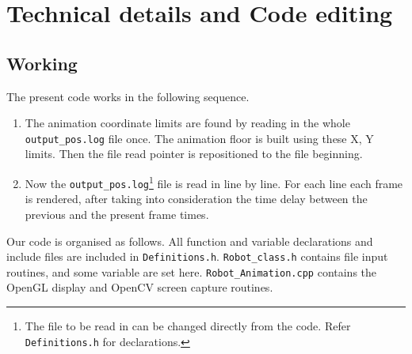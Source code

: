 \documentclass[10pt,a4paper]{article}
\begin{document}
\section{Technical details and Code editing}
\subsection{Working}
The present code works in the following sequence.
\begin{enumerate}
\item The anima\-tion co\-ordinate limits are found by reading in the whole \\ \texttt{output\_pos.log} file once. The animation floor is built using these X, Y limits. Then the file read pointer is repositioned to the file beginning.
\item Now the \texttt{output\_pos.log}\footnote{The file to be read in can be changed directly from the code. Refer \texttt{Definitions.h} for declarations.} file is read in line by line. For each line each frame is rendered, after taking into consideration the time delay between the previous and the present frame times.
\end{enumerate}
%
%
Our code is organised as follows. All function and variable declarations and include files are included in \texttt{Definitions.h}. \texttt{Robot\_class.h} contains file input routines, and some variable are set here. \texttt{Robot\_Animation.cpp} contains the OpenGL display and OpenCV screen capture routines.
%
%
\end{document}
